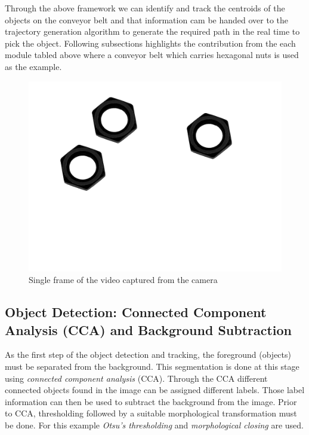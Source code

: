 \documentclass[a4paper,12pt]{book}%
\begin{document}
Through the above framework we can identify and track the centroids of the objects on the conveyor belt and that information cam be handed over to the trajectory generation algorithm to generate the required path in the real time  to pick the object. Following subsections highlights the contribution from the each module tabled above where a conveyor belt which carries hexagonal nuts is used as the example.

\begin{figure}[H]
	\centering
	\includegraphics[scale=0.17]{figures/belt}
	\caption{Single frame of the video captured from the camera}
\end{figure}


\subsection{Object Detection: Connected Component Analysis (CCA) and Background Subtraction}

As the first step of the object detection and tracking, the foreground (objects) must be separated from the background. This segmentation is done at this stage  using \textit{connected component analysis} (CCA). Through the CCA different connected objects found in the image can be assigned different labels. Those label information can then be used to subtract the background from the  image. Prior to CCA, thresholding followed by a suitable morphological transformation must be done. For this example \textit{Otsu's thresholding} and \textit{morphological closing} are used.
\end{document}

